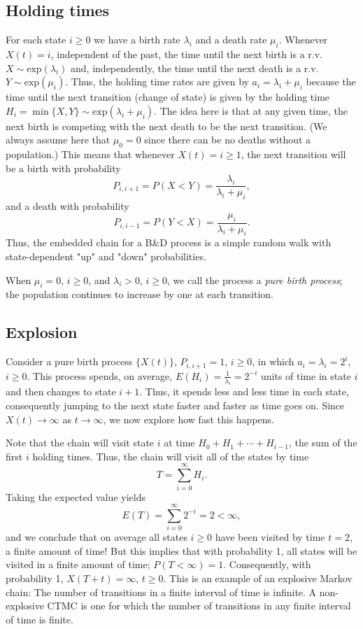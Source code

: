 \documentclass[12pt,a4paper]{article}
\begin{document}
\subsection{Holding times}
For each state $i \geq 0$ we have a birth rate $\lambda_i$ and a death rate $\mu_i$.
Whenever $X(t) = i$, independent of the past, the time until the next birth is a r.v. $X \sim \text{exp}(\lambda_i)$ and, independently, the time until the next death is a r.v. $Y \sim \text{exp}(\mu_i)$. 
Thus, the holding time rates are given by $a_i = \lambda_i + \mu_i$ because the time until the next transition (change of state) is given by the holding time $H_i = \min\{ X, Y \} \sim \text{exp}(\lambda_i + \mu_i)$. 
The idea here is that at any given time, the next birth is competing with the next death to be the next transition. (We always assume here that $\mu_0 = 0$ since there can be no deaths without a population.)
This means that whenever $X(t) = i \geq 1$, the next transition will be a birth with probability
\[
P_{i,i+1} = P(X < Y) = \frac{\lambda_i}{\lambda_i + \mu_i},
\]
and a death with probability
\[
P_{i,i-1} = P(Y < X) = \frac{\mu_i}{\lambda_i + \mu_i}.
\]
Thus, the embedded chain for a B\&D process is a simple random walk with state-dependent "up" and "down" probabilities.

When $\mu_i = 0$, $i \geq 0$, and $\lambda_i > 0$, $i \geq 0$, we call the process a \textit{pure birth process}; the population continues to increase by one at each transition.


\subsection{Explosion}
Consider a pure birth process $\{ X(t) \}$, $P_{i,i+1} = 1$, $i \geq 0$, in which $a_i = \lambda_i = 2^i$, $i \geq 0$. 
This process spends, on average, $E(H_i) = \frac{1}{\lambda_i} = 2^{-i}$ units of time in state $i$ and then changes to state $i + 1$. 
Thus, it spends less and less time in each state, consequently jumping to the next state faster and faster as time goes on. 
Since $X(t) \to \infty$ as $t \to \infty$, we now explore how fast this happens. 

Note that the chain will visit state $i$ at time $H_0 + H_1 + \cdots + H_{i-1}$, the sum of the first $i$ holding times. 
Thus, the chain will visit all of the states by time
\[
T = \sum_{i=0}^{\infty} H_i.
\]
Taking the expected value yields
\[
E(T) = \sum_{i=0}^{\infty} 2^{-i} = 2 < \infty,
\]
and we conclude that on average all states $i \geq 0$ have been visited by time $t = 2$, a finite amount of time! But this implies that with probability 1, all states will be visited in a finite amount of time; $P(T < \infty) = 1$. 
Consequently, with probability 1, $X(T + t) = \infty$, $t \geq 0$. This is an example of an explosive Markov chain: The number of transitions in a finite interval of time is infinite.
A non-explosive CTMC is one for which the number of
transitions in any finite interval of time is finite.
\end{document}
